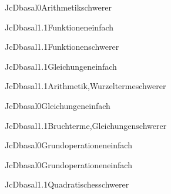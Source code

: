 \documentclass[12pt]{article}
\begin{document}
\begin{Add}{JcD}{basal0}{Arithmetik}{schwerer}
\end{Add}

\begin{Add}{JcD}{basal1.1}{Funktionen}{einfach}
\end{Add}

\begin{Add}{JcD}{basal1.1}{Funktionen}{schwerer}
\end{Add}

\begin{Add}{JcD}{basal1.1}{Gleichungen}{einfach}
\end{Add}

\begin{Add}{JcD}{basal1.1}{Arithmetik,Wurzelterme}{schwerer}
\end{Add}

\begin{Add}{JcD}{basal0}{Gleichungen}{einfach}
\end{Add}

\begin{Add}{JcD}{basal1.1}{Bruchterme,Gleichungen}{schwerer}
\end{Add}

\begin{Add}{JcD}{basal0}{Grundoperationen}{einfach}
\end{Add}

\begin{Add}{JcD}{basal0}{Grundoperationen}{einfach}
\end{Add}

\begin{Add}{JcD}{basal1.1}{Quadratisches}{schwerer}
\end{Add}
\end{document}

